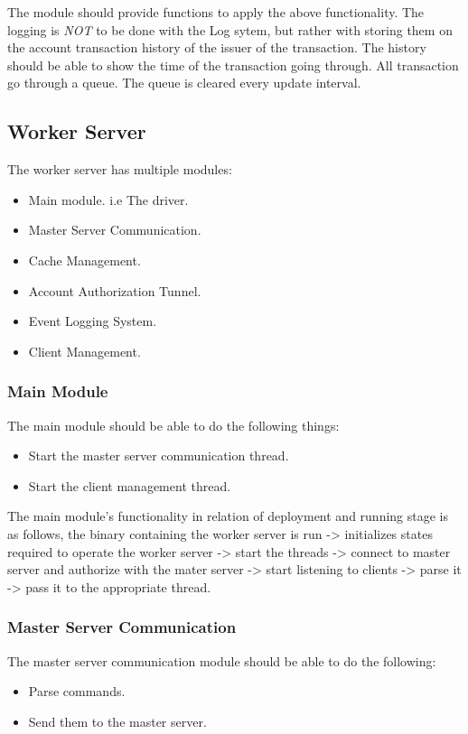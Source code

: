 \documentclass[a4paper]{article}
\begin{document}
The module should provide functions to apply the above functionality. The
logging is \emph{NOT} to be done with the Log sytem, but rather with storing
them on the account transaction history of the issuer of the transaction. The 
history should be able to show the time of the transaction going through. All 
transaction go through a queue. The queue is cleared every update interval.

\subsection{Worker Server}
\label{technical_worker_server}
The worker server has multiple modules:
\begin{itemize}
	\item Main module. i.e The driver.
	\item Master Server Communication.
	\item Cache Management.
	\item Account Authorization Tunnel.
	\item Event Logging System.
	\item Client Management.
\end{itemize}

\subsubsection{Main Module}
\label{worker_mods_main}
The main module should be able to do the following things:
\begin{itemize}
	\item Start the master server communication thread.
	\item Start the client management thread.
\end{itemize}

The main module's functionality in relation of deployment and running stage is 
as follows, the binary containing the worker server is run -> initializes
states required to operate the worker server -> start the threads -> connect to
master server and authorize with the mater server -> start listening to clients
-> parse it -> pass it to the appropriate thread.

\subsubsection{Master Server Communication}
\label{worker_mods_master_comms}
The master server communication module should be able to do the following:
\begin{itemize}
	\item Parse commands.
	\item Send them to the master server.
\end{itemize}
\end{document}
